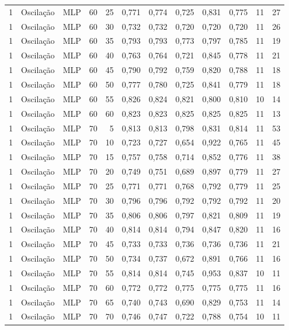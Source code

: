 \begin{longtable}{@{}rllrrrrrrrrr@{}}
1 & Oscilação & MLP & 60 & 25 & 0,771 & 0,774 & 0,725 & 0,831 & 0,775 & 11 & 27 \\
1 & Oscilação & MLP & 60 & 30 & 0,732 & 0,732 & 0,720 & 0,720 & 0,720 & 11 & 26 \\
1 & Oscilação & MLP & 60 & 35 & 0,793 & 0,793 & 0,773 & 0,797 & 0,785 & 11 & 19 \\
1 & Oscilação & MLP & 60 & 40 & 0,763 & 0,764 & 0,721 & 0,845 & 0,778 & 11 & 21 \\
1 & Oscilação & MLP & 60 & 45 & 0,790 & 0,792 & 0,759 & 0,820 & 0,788 & 11 & 18 \\
1 & Oscilação & MLP & 60 & 50 & 0,777 & 0,780 & 0,725 & 0,841 & 0,779 & 11 & 18 \\
1 & Oscilação & MLP & 60 & 55 & 0,826 & 0,824 & 0,821 & 0,800 & 0,810 & 10 & 14 \\
1 & Oscilação & MLP & 60 & 60 & 0,823 & 0,823 & 0,825 & 0,825 & 0,825 & 11 & 13 \\
1 & Oscilação & MLP & 70 & 5 & 0,813 & 0,813 & 0,798 & 0,831 & 0,814 & 11 & 53 \\
1 & Oscilação & MLP & 70 & 10 & 0,723 & 0,727 & 0,654 & 0,922 & 0,765 & 11 & 45 \\
1 & Oscilação & MLP & 70 & 15 & 0,757 & 0,758 & 0,714 & 0,852 & 0,776 & 11 & 38 \\
1 & Oscilação & MLP & 70 & 20 & 0,749 & 0,751 & 0,689 & 0,897 & 0,779 & 11 & 27 \\
1 & Oscilação & MLP & 70 & 25 & 0,771 & 0,771 & 0,768 & 0,792 & 0,779 & 11 & 25 \\
1 & Oscilação & MLP & 70 & 30 & 0,796 & 0,796 & 0,792 & 0,792 & 0,792 & 11 & 20 \\
1 & Oscilação & MLP & 70 & 35 & 0,806 & 0,806 & 0,797 & 0,821 & 0,809 & 11 & 19 \\
1 & Oscilação & MLP & 70 & 40 & 0,814 & 0,814 & 0,794 & 0,847 & 0,820 & 11 & 16 \\
1 & Oscilação & MLP & 70 & 45 & 0,733 & 0,733 & 0,736 & 0,736 & 0,736 & 11 & 21 \\
1 & Oscilação & MLP & 70 & 50 & 0,734 & 0,737 & 0,672 & 0,891 & 0,766 & 11 & 16 \\
1 & Oscilação & MLP & 70 & 55 & 0,814 & 0,814 & 0,745 & 0,953 & 0,837 & 10 & 11 \\
1 & Oscilação & MLP & 70 & 60 & 0,772 & 0,772 & 0,775 & 0,775 & 0,775 & 11 & 16 \\
1 & Oscilação & MLP & 70 & 65 & 0,740 & 0,743 & 0,690 & 0,829 & 0,753 & 11 & 14 \\
1 & Oscilação & MLP & 70 & 70 & 0,746 & 0,747 & 0,722 & 0,788 & 0,754 & 10 & 11 \\

\end{longtable}
